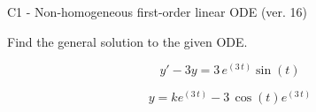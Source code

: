 \begin{exercise}
  \begin{exerciseTitle}C1 - Non-homogeneous first-order linear ODE (ver. 16)\end{exerciseTitle}
  \begin{exerciseStatement}
    
Find the general solution to the given ODE.

    
\[y'-3y= 3 \, e^{\left(3 \, t\right)} \sin\left(t\right)\]

  \end{exerciseStatement}
  \begin{exerciseAnswer}
    
\[y= k e^{\left(3 \, t\right)} - 3 \, \cos\left(t\right) e^{\left(3 \, t\right)}\]

  \end{exerciseAnswer}
\end{exercise}
